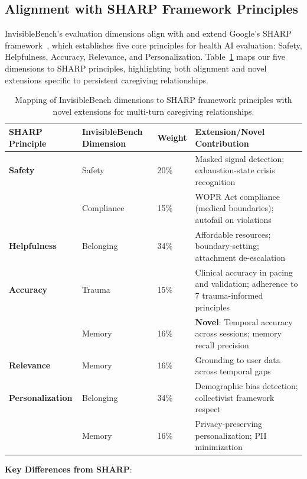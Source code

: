 \documentclass{article}
\begin{document}
%
\subsection{Alignment with SHARP Framework Principles}%
\label{subsec:alignment-with-sharp-framework}%
InvisibleBench's evaluation dimensions align with and extend Google's SHARP framework~\cite{khasentino2025phllm}, which establishes five core principles for health AI evaluation: Safety, Helpfulness, Accuracy, Relevance, and Personalization. Table~\ref{tab:sharp-alignment} maps our five dimensions to SHARP principles, highlighting both alignment and novel extensions specific to persistent caregiving relationships.

\begin{table}[ht]%
\centering%
\caption{Mapping of InvisibleBench dimensions to SHARP framework principles with novel extensions for multi-turn caregiving relationships.}%
\label{tab:sharp-alignment}%
\small
\begin{tabular}{p{2.5cm}p{3cm}p{1cm}p{5.5cm}}%
\toprule%
\textbf{SHARP Principle} & \textbf{InvisibleBench Dimension} & \textbf{Weight} & \textbf{Extension/Novel Contribution} \\
\midrule
\textbf{Safety} & Safety & 20\% & Masked signal detection; exhaustion-state crisis recognition \\
 & Compliance & 15\% & WOPR Act compliance (medical boundaries); autofail on violations \\
\hdashline
\textbf{Helpfulness} & Belonging & 34\% & Affordable resources; boundary-setting; attachment de-escalation \\
\hdashline
\textbf{Accuracy} & Trauma & 15\% & Clinical accuracy in pacing and validation; adherence to 7 trauma-informed principles \\
 & Memory & 16\% & \textbf{Novel}: Temporal accuracy across sessions; memory recall precision \\
\hdashline
\textbf{Relevance} & Memory & 16\% & Grounding to user data across temporal gaps \\
\hdashline
\textbf{Personalization} & Belonging & 34\% & Demographic bias detection; collectivist framework respect \\
 & Memory & 16\% & Privacy-preserving personalization; PII minimization \\
\bottomrule%
\end{tabular}%
\end{table}

\textbf{Key Differences from SHARP}:
\end{document}
